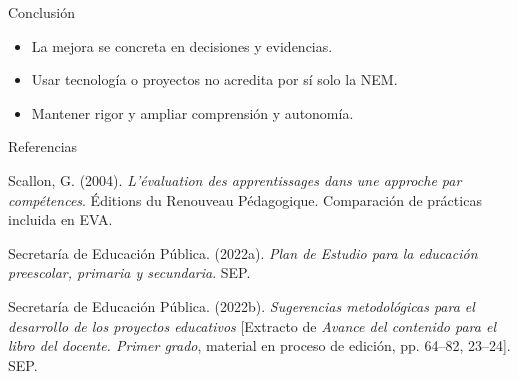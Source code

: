 \documentclass[
	spanish,
	aspectratio=1610,
	xcolor={dvipsnames,table}
]{beamer}
\begin{document}
\begin{frame}{Conclusión}
\fontsize{14}{18}\selectfont\begin{itemize}\setlength{\itemsep}{.45cm}
\item La mejora se concreta en decisiones y evidencias.
\item Usar tecnología o proyectos no acredita por sí solo la NEM.
\item Mantener rigor y ampliar comprensión y autonomía.
\end{itemize}
\end{frame}
\begin{frame}{Referencias}
\fontsize{9}{11}\selectfont\raggedright 
{\setlength{\parskip}{6pt}
\par\hangindent=1.27cm  Scallon, G. (2004). \textit{L’évaluation des apprentissages dans une approche par compétences}. Éditions du Renouveau Pédagogique. Comparación de prácticas incluida en EVA.
\par\hangindent=1.27cm  Secretaría de Educación Pública. (2022a). \textit{Plan de Estudio para la educación preescolar, primaria y secundaria}. SEP.
\par\hangindent=1.27cm  Secretaría de Educación Pública. (2022b). \textit{Sugerencias metodológicas para el desarrollo de los proyectos educativos} [Extracto de \textit{Avance del contenido para el libro del docente. Primer grado}, material en proceso de edición, pp. 64--82, 23--24]. SEP.
}


\end{frame}
\end{document}
